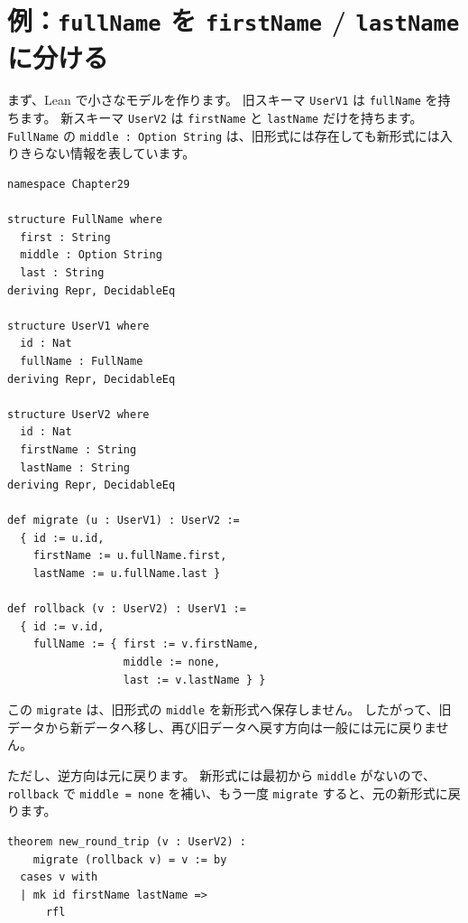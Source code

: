 \section{例：\texttt{fullName} を \texttt{firstName} / \texttt{lastName} に分ける}

まず、Lean で小さなモデルを作ります。
旧スキーマ \texttt{UserV1} は \texttt{fullName} を持ちます。
新スキーマ \texttt{UserV2} は \texttt{firstName} と \texttt{lastName} だけを持ちます。
\texttt{FullName} の \texttt{middle : Option String} は、旧形式には存在しても新形式には入りきらない情報を表しています。

\begin{listing}[htbp]
\begin{verbatim}
namespace Chapter29

structure FullName where
  first : String
  middle : Option String
  last : String
deriving Repr, DecidableEq

structure UserV1 where
  id : Nat
  fullName : FullName
deriving Repr, DecidableEq

structure UserV2 where
  id : Nat
  firstName : String
  lastName : String
deriving Repr, DecidableEq

def migrate (u : UserV1) : UserV2 :=
  { id := u.id,
    firstName := u.fullName.first,
    lastName := u.fullName.last }

def rollback (v : UserV2) : UserV1 :=
  { id := v.id,
    fullName := { first := v.firstName,
                  middle := none,
                  last := v.lastName } }
\end{verbatim}
\caption{\texttt{UserV1}・\texttt{UserV2}・相互変換}
\label{lst:ch29-model}
\end{listing}

この \texttt{migrate} は、旧形式の \texttt{middle} を新形式へ保存しません。
したがって、旧データから新データへ移し、再び旧データへ戻す方向は一般には元に戻りません。

ただし、逆方向は元に戻ります。
新形式には最初から \texttt{middle} がないので、\texttt{rollback} で \texttt{middle = none} を補い、もう一度 \texttt{migrate} すると、元の新形式に戻ります。

\begin{listing}[htbp]
\begin{verbatim}
theorem new_round_trip (v : UserV2) :
    migrate (rollback v) = v := by
  cases v with
  | mk id firstName lastName =>
      rfl
\end{verbatim}
\caption{\texttt{new\_round\_trip}}
\label{lst:ch29-new-roundtrip}
\end{listing}

